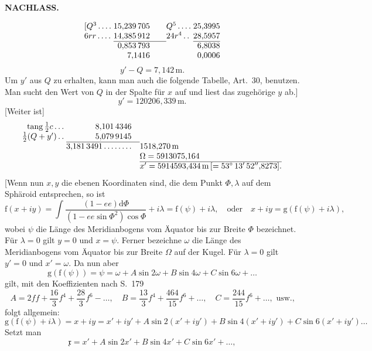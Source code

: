 \par\clearpage
{}\hfill{\small\textbf{NACHLASS.}}\hfill\null\par\medskip
\[
\begin{array}{@{}l@{\;}r@{\qquad}l@{\;}r@{}}
[Q^3\,.\,.\,.\,.&15{,}239\,705&Q^5\,.\,.\,.\,.&25{,}3995\\
6rr\,.\,.\,.\,.&14{,}385\,912&24r^4\,.\,.&28{,}5957\\\cline{2-2}\cline{4-4}
&0{,}853\,793&&6{,}8038\\
&7{,}1416&&0{,}0006
\end{array}
\]
\[y'-Q=7{,}142\,\mathrm{m}.\]
Um \(y'\) aus \(Q\) zu erhalten, kann man auch die folgende Tabelle, Art.~30, benutzen. Man sucht den Wert von \(Q\) in der Spalte für \(x\) auf und liest das zugehörige \(y\) ab.]
\[y'=120206{,}339\,\mathrm{m}.\]
[Weiter ist]
\[
\begin{array}{@{}r@{\;}r@{\quad}l@{}}
\operatorname{tang}\tfrac12c\,.\,.\,.&8{,}101\,4346&\\
\tfrac12(Q+y')\,.\,.&5{,}079\,9145&\\\cline{2-2}
&3{,}181\,3491\,.\,.\,.\,.\,.\,.\,.\,.&1518{,}270\,\mathrm{m}\\
&&\Omega=5913075{,}164\\\cline{3-3}
&&x'=5914593{,}434\,\mathrm{m}\,[=53^\circ\,13'\,52''{,}8273].
\end{array}
\]
[Wenn nun \(x,y\) die ebenen Koordinaten sind, die dem Punkt \(\Phi,\lambda\) auf dem Sphäroid entsprechen, so ist
\[
\mathrm{f}(x+iy)=\int\frac{(1-ee)\mathrm{d}\Phi}{(1-ee\sin\Phi^2)\cos\Phi}+i\lambda
=\mathrm{f}(\psi)+i\lambda,\quad\text{oder}\quad x+iy=\mathrm{g}(\mathrm{f}(\psi)+i\lambda),
\]
\noindent wobei \(\psi\) die Länge des Meridianbogens vom Äquator bis zur Breite \(\Phi\) bezeichnet. Für \(\lambda=0\) gilt \(y=0\) und \(x=\psi\). Ferner bezeichne \(\omega\) die Länge des Meridianbogens vom Äquator bis zur Breite \(\Omega\) auf der Kugel. Für \(\lambda=0\) gilt \(y'=0\) und \(x'=\omega\). Da nun aber
\[
\mathrm{g}(\mathrm{f}(\psi))=\psi=\omega+A\sin2\omega+B\sin4\omega+C\sin6\omega+\ldots
\]
\noindent gilt, mit den Koeffizienten nach S.~179
\[
A=2ff+\frac{16}{3}f^4+\frac{28}{3}f^6-\ldots,\quad
B=\frac{13}{3}f^4+\frac{464}{15}f^6+\ldots,\quad
C=\frac{244}{15}f^6+\ldots,\text{ usw.,}
\]
\noindent folgt allgemein:
\[
\mathrm{g}(\mathrm{f}(\psi)+i\lambda)=x+iy=x'+iy'+A\sin2(x'+iy')+B\sin4(x'+iy')+C\sin6(x'+iy')\ldots
\]
Setzt man
\[\mathfrak{x}=x'+A\sin2x'+B\sin4x'+C\sin6x'+\ldots,\]

